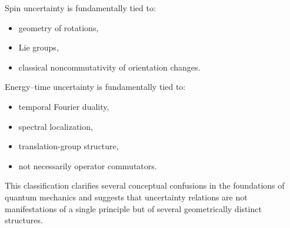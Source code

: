 Spin uncertainty is fundamentally tied to:
\begin{itemize}
\item geometry of rotations,
\item Lie groups,
\item classical noncommutativity of orientation changes.
\end{itemize}

Energy--time uncertainty is fundamentally tied to:
\begin{itemize}
\item temporal Fourier duality,
\item spectral localization,
\item translation-group structure,
\item not necessarily operator commutators.
\end{itemize}

This classification clarifies several conceptual confusions in the foundations of 
quantum mechanics and suggests that uncertainty relations are not 
manifestations of a single principle but of several geometrically distinct structures.

